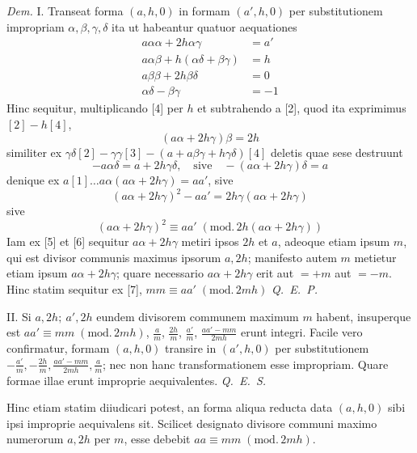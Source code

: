 \textit{Dem.} I. Transeat forma $(a,h,0)$ in formam $(a',h,0)$ per substitutionem impropriam $\alpha,\beta,\gamma,\delta$ ita ut habeantur quatuor aequationes
\begin{align*}
a\alpha\alpha+2h\alpha\gamma&=a'\tag*{. . . . . . . . . . . . [1]}\\
a\alpha\beta+h(\alpha\delta+\beta\gamma)&=h\tag*{. . . . . . . . . . [2]}\\
a\beta\beta+2h\beta\delta&=0\tag*{. . . . . . . . . . . . [3]}\\
\alpha\delta-\beta\gamma&=-1\tag*{. . . . . . . . . . . . . [4]}
\end{align*}
Hinc sequitur, multiplicando [4] per $h$ et subtrahendo a [2], quod ita exprimimus $[2]-h[4]$,
\begin{equation*}
(a\alpha+2h\gamma)\beta=2h\tag*{. . . . . . . . . . . . [5]}
\end{equation*}
similiter ex $\gamma\delta[2]-\gamma\gamma[3]-(a+a\beta\gamma+h\gamma\delta)[4]$ deletis quae sese destruunt
\begin{equation*}
-a\alpha\delta=a+2h\gamma\delta,\quad\text{sive}\quad -(a\alpha+2h\gamma)\delta=a\tag*{. . [6]}
\end{equation*}
denique ex $a[1]\ldots a\alpha(a\alpha+2h\gamma)=aa'$, sive
\[
(a\alpha+2h\gamma)^2-aa'=2h\gamma(a\alpha+2h\gamma)
\]
sive
\begin{equation*}
(a\alpha+2h\gamma)^2\equiv aa'\;(\mathrm{mod.}\,2h(a\alpha+2h\gamma))\tag*{. . . . . [7]}
\end{equation*}
Iam ex [5] et [6] sequitur $a\alpha+2h\gamma$ metiri ipsos $2h$ et $a$, adeoque etiam ipsum $m$, qui est divisor communis maximus ipsorum $a,2h$; manifesto autem $m$ metietur etiam ipsum $a\alpha+2h\gamma$; quare necessario $a\alpha+2h\gamma$ erit aut $=+m$ aut $=-m$. Hinc statim sequitur ex [7], $mm\equiv aa'\;(\mathrm{mod.}\,2mh)$ \textit{Q.~E.~P.}

II. Si $a,2h;\ a',2h$ eundem divisorem communem maximum $m$ habent, insuperque est $aa'\equiv mm\;(\mathrm{mod.}\,2mh)$, $\frac a m$, $\frac{2h}{m}$, $\frac{a'}{m}$, $\frac{aa'-mm}{2mh}$ erunt integri. Facile vero confirmatur, formam $(a,h,0)$ transire in $(a',h,0)$ per substitutionem $-\frac{a'}{m},-\frac{2h}{m},\frac{aa'-mm}{2mh},\frac a m$; nec non hanc transformationem esse impropriam. Quare formae illae erunt improprie aequivalentes. \textit{Q.~E.~S.}

Hinc etiam statim diiudicari potest, an forma aliqua reducta data $(a,h,0)$ sibi ipsi improprie aequivalens sit. Scilicet designato divisore communi maximo numerorum $a,2h$ per $m$, esse debebit $aa\equiv mm\;(\mathrm{mod.}\,2mh)$.


